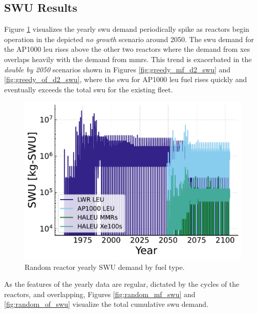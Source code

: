 \subsection{SWU Results}
\label{sec:random_swu}

Figure \ref{fig:swu_yearly_random} visualizes the yearly \gls{swu} demand periodically spike as reactors begin operation in the depicted \textit{no growth} scenario around 2050. The \gls{swu} demand for the AP1000 \gls{leu} rises above the other two reactors where the demand from \glspl{xe} overlaps heavily with the demand from \glspl{mmr}. This trend is exacerbated in the \textit{double by 2050} scenarios shown in Figures \ref{fig:greedy_mf_d2_swu} and \ref{fig:greedy_of_d2_swu}, where the \gls{swu} for AP1000 \gls{leu} fuel rises quickly and eventually exceeds the total \gls{swu} for the existing fleet.



\begin{figure}[H]
    \centering
    \includegraphics[scale=0.7]{images/results/swu/multi_drng_swu_by_fuel.pdf}
    \caption{Random reactor yearly SWU demand by fuel type.}
    \label{fig:swu_yearly_random}
\end{figure}

As the features of the yearly data are regular, dictated by the cycles of the
reactors, and overlapping, Figures \ref{fig:random_mf_swu} and \ref{fig:random_of_swu} visualize the total cumulative \gls{swu} demand.


